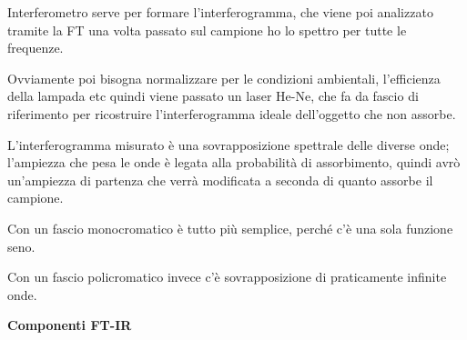 Interferometro serve per formare l'interferogramma, che viene poi
analizzato tramite la FT una volta passato sul campione ho lo spettro
per tutte le frequenze.

Ovviamente poi bisogna normalizzare per le condizioni ambientali,
l'efficienza della lampada etc quindi viene passato un laser He-Ne, che
fa da fascio di riferimento per ricostruire l'interferogramma ideale
dell'oggetto che non assorbe.

L'interferogramma misurato è una sovrapposizione spettrale delle diverse
onde; l'ampiezza che pesa le onde è legata alla probabilità di
assorbimento, quindi avrò un'ampiezza di partenza che verrà modificata a
seconda di quanto assorbe il campione.

Con un fascio monocromatico è tutto più semplice, perché c'è una sola
funzione seno.

Con un fascio policromatico invece c'è sovrapposizione di praticamente
infinite onde.

\textbf{Componenti FT-IR}

